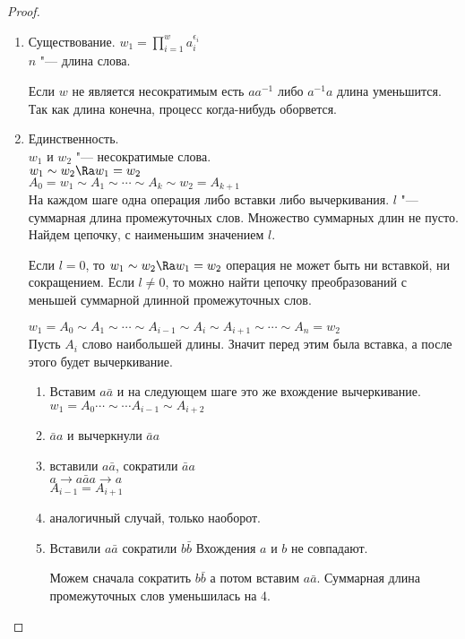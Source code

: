 \begin{proof}
 \begin{enumerate}
 \item
 Существование.
 $w_1 = \prod_{i = 1}^{w}a_i^{\epsilon_i}$\\
 $n$ "--- длина слова.

 Если $w$ не является несократимым есть $aa^{-1}$  либо $a^{-1}a$ длина уменьшится.
 Так как длина конечна, процесс когда-нибудь оборвется.
 \item
 Единственность. \\
 $w_1$ и $w_2$ "--- несократимые слова.\\
 $w_1 \sim w_2 \Ra w_1 = w_2$\\
 $A_0 = w_1 \sim A_1 \sim \cdots \sim A_k \sim w_2 = A_{k + 1}$\\
 На каждом шаге одна операция либо вставки либо вычеркивания. 
 $l$ "--- суммарная длина промежуточных слов.
 Множество суммарных длин не пусто. Найдем цепочку, с наименьшим значением $l$.

 Если $l = 0$, то $w_1 \sim w_2 \Ra w_1 = w_2$
 операция не может быть ни вставкой, ни сокращением.
 Если $l \ne 0$, то можно найти цепочку преобразований 
 с меньшей суммарной длинной промежуточных слов.

 $w_1 = A_0 \sim A_1 \sim \cdots \sim A_{i - 1} \sim A_i \sim A_{i + 1} \sim \cdots \sim A_n = w_2$\\
 Пусть $A_i$ слово наибольшей длины. Значит перед этим была вставка, а после этого будет вычеркивание.

 \begin{enumerate}
 \item Вставим $a\bar{a}$ и на следующем шаге это же вхождение вычеркивание. \\
 $w_1 = A_0 \cdots \sim \cdots A_{i - 1} \sim A_{i + 2}$\\
 \item
 $\bar{a}a$ и вычеркнули $\bar{a}{a}$\\
 \item
 вставили $a\bar{a}$, сократили $\bar{a} a$\\
 $a \to a\bar{a}{a} \to a$\\
 $A_{i - 1} = A_{i + 1}$
 \item аналогичный случай, только наоборот.
 \item
 Вставили $a\bar{a}$ сократили $b \bar{b}$
 Вхождения $a$ и $b$ не совпадают. 

 Можем сначала сократить $b\bar{b}$ а потом вставим $a\bar{a}$. Суммарная длина
 промежуточных слов уменьшилась на 4.
 \end{enumerate}
 \end{enumerate}
\end{proof}
